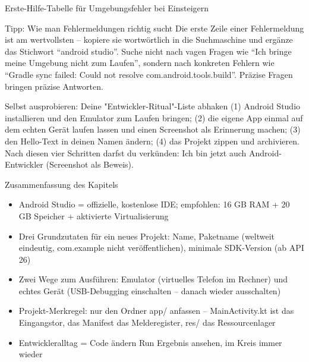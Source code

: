 \begin{center}\small\color{gray}Erste-Hilfe-Tabelle für Umgebungsfehler bei Einsteigern\end{center}

\begin{tcbinfo}{Tipp: Wie man Fehlermeldungen richtig sucht}
Die erste Zeile einer Fehlermeldung ist am wertvollsten – kopiere sie wortwörtlich in die Suchmaschine und ergänze das Stichwort “android studio”. Suche nicht nach vagen Fragen wie “Ich bringe meine Umgebung nicht zum Laufen”, sondern nach konkreten Fehlern wie “Gradle sync failed: Could not resolve com.android.tools.build”. Präzise Fragen bringen präzise Antworten.

\end{tcbinfo}

\begin{tcbpractice}{Selbst ausprobieren: Deine "Entwickler-Ritual"-Liste abhaken}
(1) Android Studio installieren und den Emulator zum Laufen bringen; (2) die eigene App einmal auf dem echten Gerät laufen lassen und einen Screenshot als Erinnerung machen; (3) den Hello-Text in deinen Namen ändern; (4) das Projekt zippen und archivieren. Nach diesen vier Schritten darfst du verkünden: Ich bin jetzt auch Android-Entwickler (Screenshot als Beweis).

\end{tcbpractice}

\begin{tcbsummary}{Zusammenfassung des Kapitels}
\begin{itemize}
  \item Android Studio = offizielle, kostenlose IDE; empfohlen: 16 GB RAM + 20 GB Speicher + aktivierte Virtualisierung
  \item Drei Grundzutaten für ein neues Projekt: Name, Paketname (weltweit eindeutig, com.example nicht veröffentlichen), minimale SDK-Version (ab API 26)
  \item Zwei Wege zum Ausführen: Emulator (virtuelles Telefon im Rechner) und echtes Gerät (USB-Debugging einschalten – danach wieder ausschalten)
  \item Projekt-Merkregel: nur den Ordner app/ anfassen – MainActivity.kt ist das Eingangstor, das Manifest das Melderegister, res/ das Ressourcenlager
  \item Entwickleralltag = Code ändern Run Ergebnis ansehen, im Kreis immer wieder
\end{itemize}

\end{tcbsummary}

